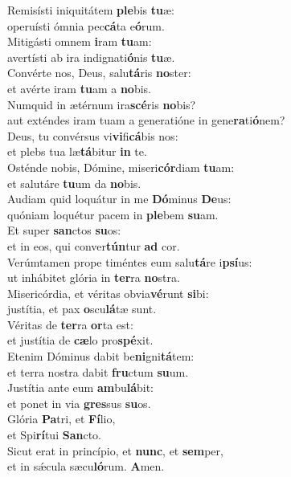 \evenverse Remisísti iniquitátem \textbf{ple}bis \textbf{tu}æ:~\*\\
\evenverse operuísti ómnia pec\textbf{cá}ta e\textbf{ó}rum.\\
\oddverse Mitigásti omnem \textbf{i}ram \textbf{tu}am:~\*\\
\oddverse avertísti ab ira indignati\textbf{ó}nis \textbf{tu}æ.\\
\evenverse Convérte nos, Deus, salu\textbf{tá}ris \textbf{no}ster:~\*\\
\evenverse et avérte iram \textbf{tu}am a \textbf{no}bis.\\
\oddverse Numquid in ætérnum ira\textbf{scé}ris \textbf{no}bis?~\*\\
\oddverse aut exténdes iram tuam a generatióne in gene\textbf{ra}ti\textbf{ó}nem?\\
\evenverse Deus, tu convérsus vi\textbf{vi}fi\textbf{cá}bis nos:~\*\\
\evenverse et plebs tua læ\textbf{tá}bitur \textbf{in} te.\\
\oddverse Osténde nobis, Dómine, miseri\textbf{cór}diam \textbf{tu}am:~\*\\
\oddverse et salutáre \textbf{tu}um da \textbf{no}bis.\\
\evenverse Audiam quid loquátur in me \textbf{Dó}minus \textbf{De}us:~\*\\
\evenverse quóniam loquétur pacem in \textbf{ple}bem \textbf{su}am.\\
\oddverse Et super \textbf{san}ctos \textbf{su}os:~\*\\
\oddverse et in eos, qui conver\textbf{tún}tur \textbf{ad} cor.\\
\evenverse Verúmtamen prope timéntes eum salu\textbf{tá}re i\textbf{psí}us:~\*\\
\evenverse ut inhábitet glória in \textbf{ter}ra \textbf{no}stra.\\
\oddverse Misericórdia, et véritas obvia\textbf{vé}runt \textbf{si}bi:~\*\\
\oddverse justítia, et pax \textbf{o}scu\textbf{lá}tæ sunt.\\
\evenverse Véritas de \textbf{ter}ra \textbf{or}ta est:~\*\\
\evenverse et justítia de \textbf{cæ}lo pro\textbf{spé}xit.\\
\oddverse Etenim Dóminus dabit be\textbf{ni}gni\textbf{tá}tem:~\*\\
\oddverse et terra nostra dabit \textbf{fru}ctum \textbf{su}um.\\
\evenverse Justítia ante eum \textbf{am}bu\textbf{lá}bit:~\*\\
\evenverse et ponet in via \textbf{gres}sus \textbf{su}os.\\
\oddverse Glória \textbf{Pa}tri, et \textbf{Fí}lio,~\*\\
\oddverse et Spi\textbf{rí}tui \textbf{San}cto.\\
\evenverse Sicut erat in princípio, et \textbf{nunc}, et \textbf{sem}per,~\*\\
\evenverse et in sǽcula sæcu\textbf{ló}rum. \textbf{A}men.\\
